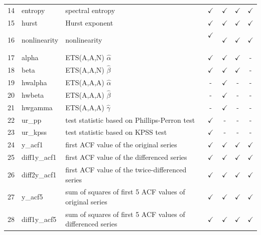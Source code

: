\documentclass[11pt,a4paper,]{article}
\def\yes{$\checkmark$}
\begin{document}
\begin{table}[!htp]
\begin{tabular}{llp{}cccc}
14 & entropy        & spectral entropy                                                                        & \yes  & \yes & \yes & \yes\\
15 & hurst          & Hurst exponent                                                                          & \yes  & \yes & \yes & \yes\\
16 & nonlinearity   & nonlinearity                                                                            & \yes\ & \yes & \yes & \yes\\
17 & alpha          & ETS(A,A,N) $\hat\alpha$                                                                 & \yes  & \yes & \yes & -\\
18 & beta           & ETS(A,A,N) $\hat\beta$                                                                  & \yes  & \yes & \yes & - \\
19 & hwalpha        & ETS(A,A,A) $\hat\alpha$                                                                 & -     & \yes & - & -\\
20 & hwbeta         & ETS(A,A,A) $\hat\beta$                                                                  & -     & \yes & - & - \\
21 & hwgamma        & ETS(A,A,A) $\hat\gamma$                                                                 & -     & \yes & - &-\\
22 & ur\_pp         & test statistic based on Phillips-Perron test                                            & \yes  & - & - & - \\
23 & ur\_kpss       & test statistic based on KPSS test                                                       & \yes  & - & - & - \\
24 & y\_acf1        & first ACF value of the original series                                                  & \yes  & \yes & \yes & \yes\\
25 & diff1y\_acf1   & first ACF value of the differenced series                                               & \yes  & \yes & \yes & \yes\\
26 & diff2y\_acf1   & first ACF value of the twice-differenced series                                         & \yes  & \yes & \yes & \yes\\
27 & y\_acf5        & sum of squares of first 5 ACF values of original series                                 & \yes  & \yes & \yes & \yes\\
28 & diff1y\_acf5   & sum of squares of first 5 ACF values of differenced series                              & \yes  & \yes & \yes & \yes\\

\end{tabular}
\end{table}
\end{document}
